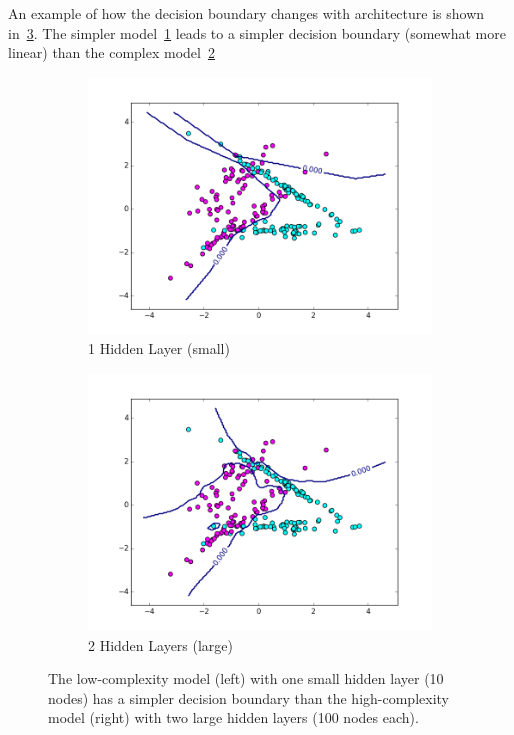 An example of how the decision boundary changes with architecture is shown in~\cref{fig:1_4_arch}.
The simpler model~\cref{fig:arch_init1} leads to a simpler decision boundary (somewhat more linear) than the complex model~\cref{fig:arch_init2}

\begin{figure}
\centering
\begin{subfigure}{.25\textwidth}
  \centering
  \includegraphics[width=.9\linewidth]{figures/1_4_data2_1hl_small}
  \caption{1 Hidden Layer (small)}
  \label{fig:arch_init1}
\end{subfigure}%
\begin{subfigure}{.25\textwidth}
  \centering
  \includegraphics[width=.9\linewidth]{figures/1_4_data2_2hl_large}
  \caption{2 Hidden Layers (large)}
  \label{fig:arch_init2}
\end{subfigure}
\caption{The low-complexity model (left) with one small hidden layer (10 nodes) has a simpler decision boundary than the high-complexity model (right) with two large hidden layers (100 nodes each).}
\label{fig:1_4_arch}
\end{figure}

